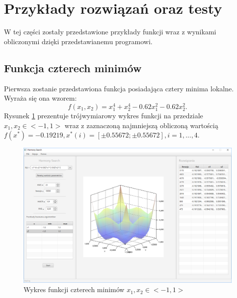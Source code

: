 \documentclass[10pt, a4paper]{article}
\begin{document}
\pagebreak

\section{Przykłady rozwiązań oraz testy}
\label{sec:przyklady}
W tej części zostały przedstawione przykłady funkcji wraz z wynikami obliczonymi dzięki przedstawianemu programowi. 

\subsection{Funkcja czterech minimów}
\label{subsec:fcn4min}
Pierwsza zostanie przedstawiona funkcja posiadająca cztery minima lokalne. Wyraża się ona wzorem: $$f(x_{1},x_{2}) = x_{1}^{4}+x_{2}^{4}-0.62x_{1}^{2}-0.62x_{2}^{2}. $$  Rysunek \ref{fig:11} prezentuje trójwymiarowy wykres funkcji na przedziale $x_{1}, x_{2} \in <-1,1>$ wraz z zaznaczoną najmniejszą obliczoną wartością $f(x^*)=-0.19219, x^{*}(i) = [ \pm0.55672; \pm 0.55672], i = 1,...,4 $. 
\begin{figure}[htbp]
	\centering
		\includegraphics[width=.9\textwidth]{images/11.PNG}
		\caption{Wykres funkcji czterech minimów $x_{1}, x_{2} \in <-1,1>$}
		\label{fig:11}
\end{figure}
\end{document}
